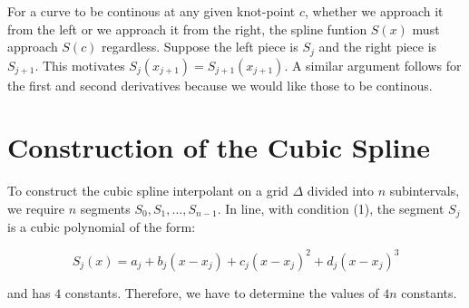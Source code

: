 \documentclass{article}
\theoremstyle{definition}
\begin{document}
For a curve to be continous at any given knot-point $c$, whether we approach it from the left or we approach it from the right, the spline funtion $S(x)$ must approach $S(c)$ regardless. Suppose the left piece is $S_j$ and the right piece is $S_{j+1}$. This motivates $S_j(x_{j + 1}) = S_{j + 1}(x_{j + 1})$. A similar argument follows for the first and second derivatives because we would like those to be continous.

\section{Construction of the Cubic Spline}

To construct the cubic spline interpolant on a grid $\Delta$ divided into $n$ subintervals, we require $n$ segments $S_0, S_1, \ldots, S_{n-1}$. In line, with condition (1), the segment $S_j$ is a cubic polynomial of the form:

$$
S_j(x) = a_j + b_j(x - x_j) + c_j(x - x_j)^2 + d_j(x - x_j)^3
$$

and has $4$ constants. Therefore, we have to determine the values of $4n$ constants.
 
\end{document}
